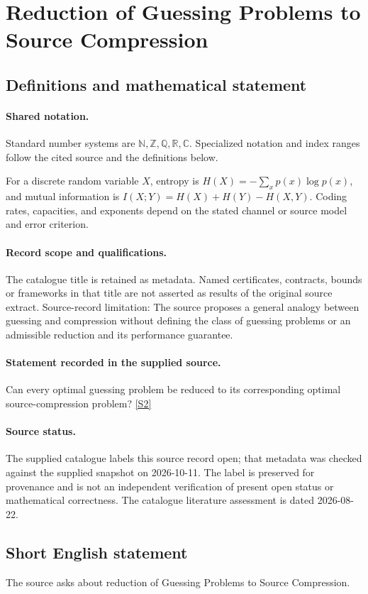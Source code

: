 \documentclass[11pt]{article}
\newcommand{\sref}[2]{\hyperlink{source:#1:#2}{[S#2]}}
\begin{document}
\section{Reduction of Guessing Problems to Source Compression}\label{statement}

\subsection{Definitions and mathematical statement}

\paragraph{Shared notation.}Standard number systems are $\mathbb N,\mathbb Z,\mathbb Q,\mathbb R,\mathbb C$. Specialized notation and index ranges follow the cited source and the definitions below.


For a discrete random variable $X$, entropy is $H(X)=-\sum_xp(x)\log p(x)$, and mutual information is $I(X;Y)=H(X)+H(Y)-H(X,Y)$. Coding rates, capacities, and exponents depend on the stated channel or source model and error criterion.
\paragraph{Record scope and qualifications.}
The catalogue title is retained as metadata. Named certificates, contracts, bounds or frameworks in that title are not asserted as results of the original source extract.
Source-record limitation: The source proposes a general analogy between guessing and compression without defining the class of guessing problems or an admissible reduction and its performance guarantee.
\paragraph{Statement recorded in the supplied source.}
Can every optimal guessing problem be reduced to its corresponding optimal source-compression problem? \sref{statement}{2}
\paragraph{Source status.}
The supplied catalogue labels this source record open; that metadata was checked against the supplied snapshot on 2026-10-11. The label is preserved for provenance and is not an independent verification of present open status or mathematical correctness. The catalogue literature assessment is dated 2026-08-22.
\subsection{Short English statement}
The source asks about reduction of Guessing Problems to Source Compression.
\end{document}
